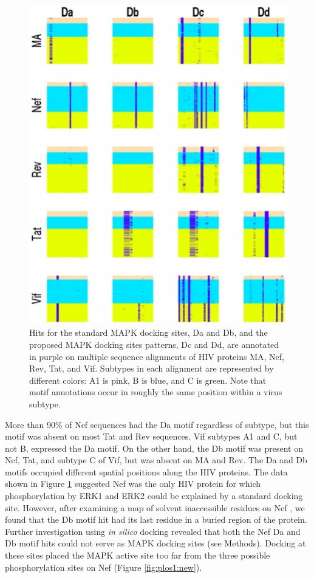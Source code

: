 \begin{figure}
\begin{center}
\includegraphics[scale=0.9]{figs/plos1_1}
\end{center}
\caption[MAPK docking site pattern hits on HIV proteins]{\small Hits
  for the standard MAPK docking sites, Da and Db, and the proposed
  MAPK docking sites patterns, Dc and Dd, are annotated in purple on
  multiple sequence alignments of HIV proteins MA, Nef, Rev, Tat, and
  Vif. Subtypes in each alignment are represented by different colors:
  A1 is pink, B is blue, and C is green. Note that motif annotations
  occur in roughly the same position within a virus
  subtype. \label{fig:plos1:fig1}}
\end{figure}

More than 90\% of Nef sequences had the Da motif regardless of
subtype, but this motif was absent on most Tat and Rev sequences. Vif
subtypes A1 and C, but not B, expressed the Da motif. On the other
hand, the Db motif was present on Nef, Tat, and subtype C of Vif, but
was absent on MA and Rev. The Da and Db motifs occupied different
spatial positions along the HIV proteins. The data shown in Figure
\ref{fig:plos1:fig1} suggested Nef was the only HIV protein for which
phosphorylation by ERK1 and ERK2 could be explained by a standard
docking site. However, after examining a map of solvent inaccessible
residues on Nef \cite{arold2001dynamic}, we found that the Db motif
hit had its last residue in a buried region of the protein. Further
investigation using \textit{in silico} docking revealed that both the Nef Da
and Db motif hits could not serve as MAPK docking sites (see
Methods). Docking at these sites placed the MAPK active site too far
from the three possible phosphorylation sites on Nef (Figure
\ref{fig:plos1:new}).

